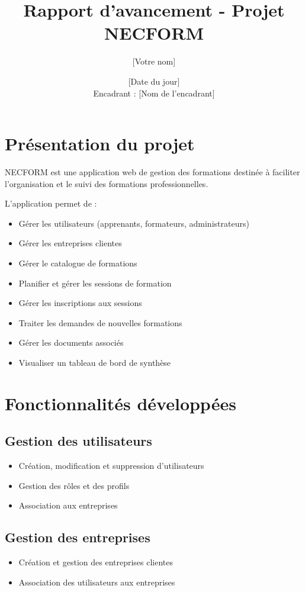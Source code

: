 \documentclass[a4paper,12pt]{article}
\title{\textbf{Rapport d'avancement - Projet NECFORM}}
\author{[Votre nom]}
\date{[Date du jour] \\ Encadrant : [Nom de l'encadrant]}
\begin{document}
\maketitle

\section*{Présentation du projet}

NECFORM est une application web de gestion des formations destinée à faciliter l'organisation et le suivi des formations professionnelles.

L'application permet de :
\begin{itemize}
    \item Gérer les utilisateurs (apprenants, formateurs, administrateurs)
    \item Gérer les entreprises clientes
    \item Gérer le catalogue de formations
    \item Planifier et gérer les sessions de formation
    \item Gérer les inscriptions aux sessions
    \item Traiter les demandes de nouvelles formations
    \item Gérer les documents associés
    \item Visualiser un tableau de bord de synthèse
\end{itemize}

\section{Fonctionnalités développées}

\subsection{Gestion des utilisateurs}
\begin{itemize}
    \item Création, modification et suppression d'utilisateurs
    \item Gestion des rôles et des profils
    \item Association aux entreprises
\end{itemize}

\subsection{Gestion des entreprises}
\begin{itemize}
    \item Création et gestion des entreprises clientes
    \item Association des utilisateurs aux entreprises
\end{itemize}
\end{document}
